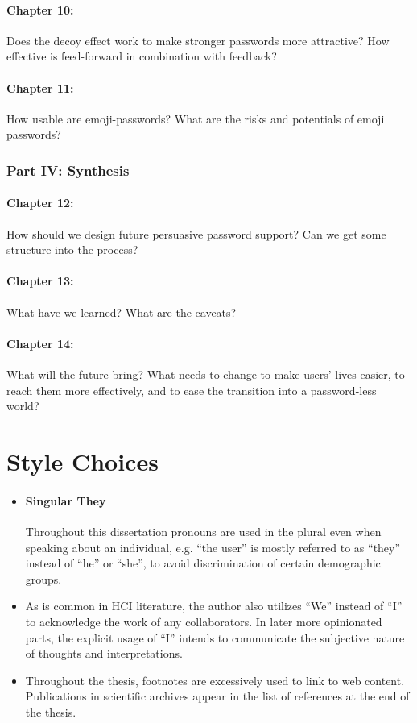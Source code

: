 \paragraph{Chapter 10:} %
Does the decoy effect work to make stronger passwords more attractive?
How effective is feed-forward in combination with feedback?

\paragraph{Chapter 11:} %
How usable are emoji-passwords?
What are the risks and potentials of emoji passwords?

\subsubsection{Part IV: Synthesis}
\paragraph{Chapter 12:} %
How should we design future persuasive password support?
Can we get some structure into the process? 

\paragraph{Chapter 13:} %
What have we learned? 
What are the caveats?

\paragraph{Chapter 14:} %
What will the future bring?
What needs to change to make users' lives easier, to reach them more effectively, and to ease the transition into a password-less world?

\section{Style Choices}
\begin{itemize}
\item \paragraph{Singular They} Throughout this dissertation pronouns are used in the plural even when speaking about an individual, e.g. ``the user'' is mostly referred to as ``they'' instead of ``he'' or ``she'', to avoid discrimination of certain demographic groups. 
\item As is common in HCI literature, the author also utilizes ``We'' instead of ``I'' to acknowledge the work of any collaborators. In later more opinionated parts, the explicit usage of ``I'' intends to communicate the subjective nature of thoughts and interpretations.
\item Throughout the thesis, footnotes are excessively used to link to web content. Publications in scientific archives appear in the list of references at the end of the thesis.
\end{itemize}


